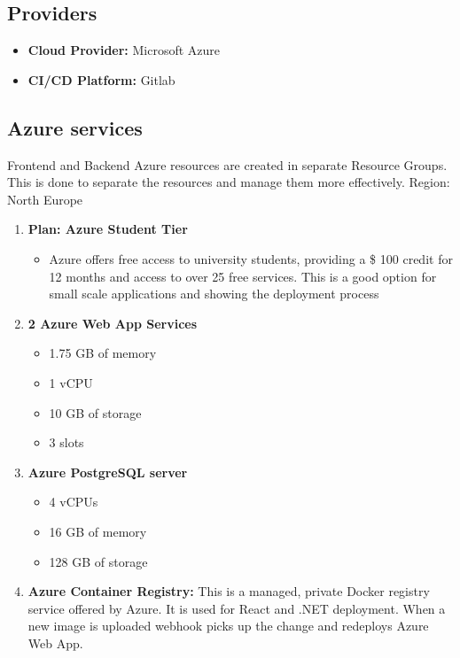 \documentclass[
    english, %
]{VUMIFPSkursinis}
\begin{document}
\subsection{Providers}
\begin{itemize}
    \item \textbf{Cloud Provider:} Microsoft Azure
    \item \textbf{CI/CD Platform:} Gitlab
\end{itemize}

\subsection{Azure services}
Frontend and Backend Azure resources are created in separate Resource Groups. This is done to separate the resources and manage them more effectively. Region: North Europe
\begin{enumerate}
    \item \textbf{Plan: Azure Student Tier}
          \begin{itemize}
              \item Azure offers free access to university students, providing a \$ 100 credit for 12 months and access to over 25 free services. This is a good option for small scale applications and showing the deployment process
          \end{itemize}
    \item \textbf{2 Azure Web App Services}
          \begin{itemize}
              \item 1.75 GB of memory
              \item 1 vCPU
              \item 10 GB of storage
              \item 3 slots
          \end{itemize}
    \item \textbf{Azure PostgreSQL server}
          \begin{itemize}
              \item 4 vCPUs
              \item 16 GB of memory
              \item 128 GB of storage
          \end{itemize}
    \item \textbf{Azure Container Registry:} This is a managed, private Docker registry service offered by Azure. It is used for React and .NET deployment. When a new image is uploaded webhook picks up the change and redeploys Azure Web App.
\end{enumerate}
\end{document}
